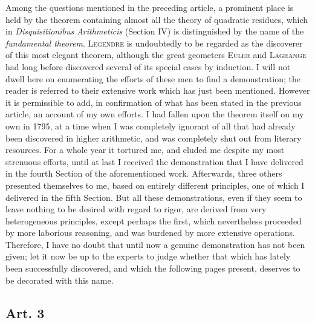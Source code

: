 \documentclass{book}
\theoremstyle{plain}
\theoremstyle{remark}
\begin{document}
Among the questions mentioned in the preceding article, a prominent place is held by the theorem containing almost all the theory of quadratic residues, which in  \textit{Disquisitionibus Arithmeticis} (Section IV) is distinguished by the name of the \textit{fundamental theorem}.  \textsc{Legendre} is undoubtedly to be regarded as the discoverer of this most elegant theorem, although the great geometers \textsc{Euler} and \textsc{Lagrange} had long before discovered several of its special cases by induction.   I will not dwell here on enumerating the efforts of these men to find a demonstration; the reader is referred to their extensive work which has just been mentioned.  However it is permissible to add, in confirmation of what has been stated in the previous article, an account of my own efforts.   I had fallen upon the theorem itself on my own in 1795, at a time when I was completely ignorant of all that had already been discovered in higher arithmetic, and was completely shut out from literary resources.  For a whole year it tortured me, and eluded me despite my most strenuous efforts, until at last I received the demonstration that I have delivered in the fourth Section of the aforementioned work.  Afterwards, three others presented themselves to me, based on entirely different principles, one of which I delivered in the fifth Section.  But all these demonstrations, even if they seem to leave nothing to be desired with regard to rigor, are derived from very heterogeneous principles, except perhaps the first, which nevertheless proceeded by more laborious reasoning, and was burdened by more extensive operations.  Therefore, I have no doubt that until now a genuine demonstration has not been given;  let it now be up to the experts to judge whether that which has lately been successfully discovered, and which the following pages present, deserves to be decorated with this name.

\subsection*{Art. 3}
\end{document}
